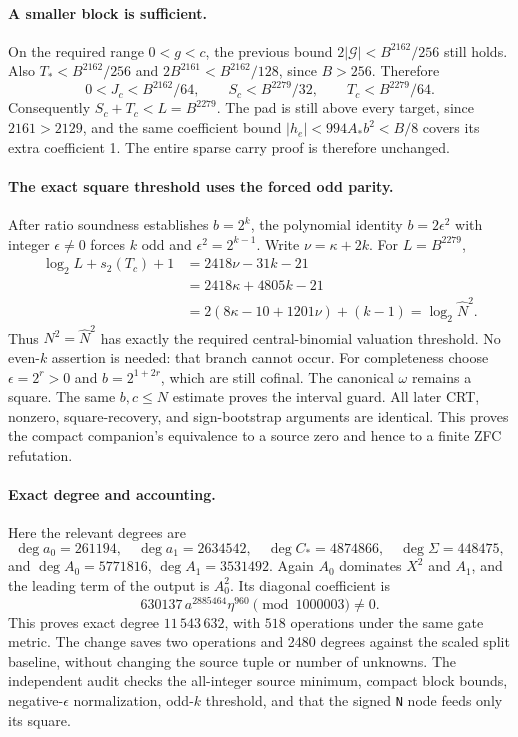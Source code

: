 \paragraph{A smaller block is sufficient.}
On the required range $0<g<c$, the previous bound
$2|\mathcal G|<B^{2162}/256$ still holds. Also
$T_*<B^{2162}/256$ and $2B^{2161}<B^{2162}/128$, since $B>256$.
Therefore
\[
 0<J_c<B^{2162}/64,\qquad
 S_c<B^{2279}/32,\qquad T_c<B^{2279}/64.
\]
Consequently $S_c+T_c<L=B^{2279}$. The pad is still above every target,
since $2161>2129$, and the same coefficient bound
$|h_e|<994A_*b^2<B/8$ covers its extra coefficient 1. The entire sparse
carry proof is therefore unchanged.

\paragraph{The exact square threshold uses the forced odd parity.}
After ratio soundness establishes $b=2^k$, the polynomial identity
$b=2\epsilon^2$ with integer $\epsilon\ne0$ forces $k$ odd and
$\epsilon^2=2^{k-1}$. Write $\nu=\kappa+2k$. For $L=B^{2279}$,
\begin{align*}
 \log_2L+s_2(T_c)+1
 &=2418\nu-31k-21\\
 &=2418\kappa+4805k-21\\
 &=2(8\kappa-10+1201\nu)+(k-1)
 =\log_2\widehat N^2.
\end{align*}
Thus $N^2=\widehat N^2$ has exactly the required central-binomial valuation
threshold. No even-$k$ assertion is needed: that branch cannot occur.
For completeness choose $\epsilon=2^r>0$ and $b=2^{1+2r}$, which are still
cofinal. The canonical $\omega$ remains a square. The same $b,c\le N$
estimate proves the interval guard. All later CRT, nonzero, square-recovery,
and sign-bootstrap arguments are identical. This proves the compact
companion's equivalence to a source zero and hence to a finite ZFC refutation.

\paragraph{Exact degree and accounting.}
Here the relevant degrees are
\[
 \deg a_0=261194,\quad \deg a_1=2634542,\quad
 \deg C_*=4874866,\quad\deg\Sigma=448475,
\]
and $\deg A_0=5771816$, $\deg A_1=3531492$. Again $A_0$ dominates
$X^2$ and $A_1$, and the leading term of the output is $A_0^2$.
Its diagonal coefficient is
\[
 630137\,a^{2885464}\eta^{960}\pmod{1000003}\ne0.
\]
This proves exact degree $11\,543\,632$, with $518$ operations under the
same gate metric. The change saves two operations and 2480 degrees against
the scaled split baseline, without changing the source tuple or number of
unknowns. The independent audit checks the all-integer source minimum,
compact block bounds, negative-$\epsilon$ normalization, odd-$k$ threshold,
and that the signed \texttt{N} node feeds only its square.
